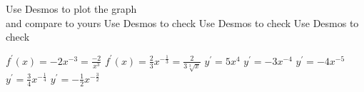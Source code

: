 \begin{Answer}[ref={exFirstPrinciples}]
\Question %
\begin{tasks}
\end{tasks}

\Question Use Desmos to plot the graph \\and compare to yours
\Question Use Desmos to check
\Question Use Desmos to check
\Question Use Desmos to check

\Question %
\begin{tasks}
	\task $f^{ \prime } (x) = -2 x^{ -3} =\frac{ -2}{x^{3}}$
	\task $f^{ \prime } \left (x\right ) =\frac{2}{3} x^{ -\frac{1}{3}} =\frac{2}{3 \sqrt[{3}]{x}}$ 
	\task $y^{ \prime } =5 x^{4}$
	\task $y^{ \prime } = -3 x^{ -4}$
	\task $y^{ \prime } = -4 x^{ -5}$
	\task $y^{ \prime } =\frac{3}{4} x^{ -\frac{1}{4}}$
	\task $y^{ \prime } = -\frac{1}{2} x^{ -\frac{3}{2}}$
	
\end{tasks}
\end{Answer}%
